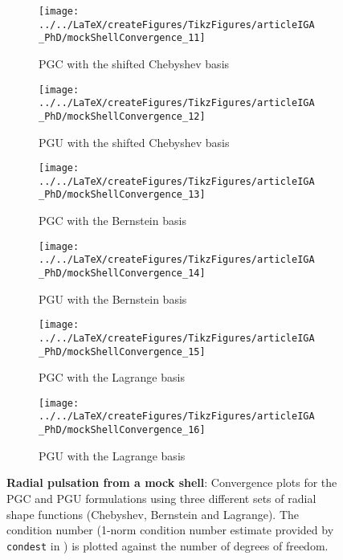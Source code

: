 \begin{figure}
	\begin{subfigure}{0.49\textwidth}
		\centering
		\texttt{[image: ../../LaTeX/createFigures/TikzFigures/articleIGA\_PhD/mockShellConvergence\_11]}
		\caption{PGC with the shifted Chebyshev basis}
	\end{subfigure}%
	\hspace*{0.02\textwidth}%
	\begin{subfigure}{0.49\textwidth}
		\centering
		\texttt{[image: ../../LaTeX/createFigures/TikzFigures/articleIGA\_PhD/mockShellConvergence\_12]}
		\caption{PGU with the shifted Chebyshev basis}
	\end{subfigure}
	\par\bigskip
	\begin{subfigure}{0.49\textwidth}
		\centering
		\texttt{[image: ../../LaTeX/createFigures/TikzFigures/articleIGA\_PhD/mockShellConvergence\_13]}
		\caption{PGC with the Bernstein basis}
	\end{subfigure}%
	\hspace*{0.02\textwidth}%
	\begin{subfigure}{0.49\textwidth}
		\centering
		\texttt{[image: ../../LaTeX/createFigures/TikzFigures/articleIGA\_PhD/mockShellConvergence\_14]}
		\caption{PGU with the Bernstein basis}
	\end{subfigure}
	\par\bigskip
	\begin{subfigure}{0.49\textwidth}
		\centering
		\texttt{[image: ../../LaTeX/createFigures/TikzFigures/articleIGA\_PhD/mockShellConvergence\_15]}
		\caption{PGC with the Lagrange basis}
	\end{subfigure}%
	\hspace*{0.02\textwidth}%
	\begin{subfigure}{0.49\textwidth}
		\centering
		\texttt{[image: ../../LaTeX/createFigures/TikzFigures/articleIGA\_PhD/mockShellConvergence\_16]}
		\caption{PGU with the Lagrange basis}
	\end{subfigure}
	\caption{\textbf{Radial pulsation from a mock shell}: Convergence plots for the PGC and PGU formulations using three different sets of radial shape functions (Chebyshev, Bernstein and Lagrange). The condition number (1-norm condition number estimate provided by \texttt{condest} in \MATLAB) is plotted against the number of degrees of freedom.}
	\label{Fig2:MS_condNumbersP}
\end{figure}

